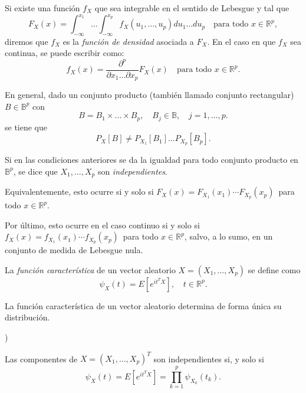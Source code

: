 \begin{ndef}
    Si existe una función $f_X$ que sea integrable en el sentido de Lebesgue y tal que
    \[
    F_X(x) = \int^{x_1}_{-\infty} \dots \int^{x_p}_{-\infty} f_X(u_1, \dots,  u_p) du_1 \dots du_p \quad \text{para todo } x \in \mathbb{R}^p
    ,\]
    diremos que $f_X$ es la \textit{función de densidad} asociada a  $F_X$. En el caso en que $f_X$ sea continua, se puede escribir como:
    \[
    f_X(x) = \frac{\partial^p}{\partial x_1 \dots \partial x_p} F_X(x) \quad \text{para todo } x \in \mathbb{R}^p
    .\]
\end{ndef}

En general, dado un conjunto producto (también llamado conjunto rectangular) $B \in \mathbb{B}^p$ con
\[
    B = B_1 \times \dots \times B_p,\quad B_j \in \mathbb{B}, \quad j = 1, \dots, p
.\]
se tiene que
\[
P_X[B] \neq P_{X_1}[B_1] \dots  P_{X_p}[B_p].
\]

\begin{ndef}
    Si en las condiciones anteriores se da la igualdad para todo conjunto producto en \(\mathbb{B}^p\), se dice que \(X_1, \dots, X_p\) son \textit{independientes}.

    Equivalentemente, esto ocurre si y solo si \(
    F_X (x) = F_{X_1} (x_1) \cdots F_{X_p}(x_p)\,\) para todo \(x \in \mathbb{R}^p\).

    Por último, esto ocurre en el caso continuo si y solo si \(f_X (x) = f_{X_1}(x_1) \cdots f_{X_p}(x_p)\,\) para todo \(x \in \mathbb{R}^p\), salvo, a lo sumo, en un conjunto de medida de Lebesgue nula.
\end{ndef}

\begin{ndef}
    La \textit{función característica} de un vector aleatorio \(X = (X_1,\dots,X_p)\) se define como \[\psi_X(t)=E[e^{it^TX}], \quad t\in \mathbb{R}^p.\]
\end{ndef}

\begin{nth}[Unicidad]
  La función característica de un vector aleatorio determina de forma única su distribución.
\end{nth})

\begin{nprop}
  Las componentes de \(X=(X_1,\dots,X_p)^T\) son independientes si, y solo si \[\psi_X(t)=E[e^{it^TX}] = \prod_{k=1}^p\psi_{X_k}(t_k).\]
\end{nprop}

